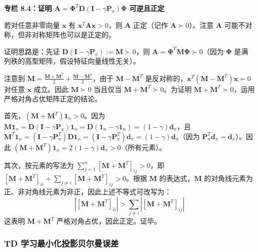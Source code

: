 \documentclass[UTF8]{article}
\begin{document}
\begin{proofbox}
\textbf{专栏 8.4：证明 $\boldsymbol{A} = \boldsymbol{\Phi}^T\boldsymbol{D}(\boldsymbol{I} - \gamma\boldsymbol{P}_\pi)\boldsymbol{\Phi}$ 可逆且正定}

若对任意非零向量 $\boldsymbol{x}$ 有 $\boldsymbol{x}^T\boldsymbol{A}\boldsymbol{x} > 0$，则 $\boldsymbol{A}$ 正定（记作 $\boldsymbol{A} \succ 0$）。注意 $\boldsymbol{A}$ 可能不对称，但非对称矩阵也可以是正定的。

证明思路是：先证 $\boldsymbol{D}(\boldsymbol{I} - \gamma\boldsymbol{P}_\pi) := \boldsymbol{M} \succ 0$，则 $\boldsymbol{A} = \boldsymbol{\Phi}^T\boldsymbol{M}\boldsymbol{\Phi} \succ 0$（因为 $\boldsymbol{\Phi}$ 是满列秩的高型矩阵，假设特征向量线性无关）。

注意到 $\boldsymbol{M} = \frac{\boldsymbol{M} + \boldsymbol{M}^T}{2} + \frac{\boldsymbol{M} - \boldsymbol{M}^T}{2}$，由于 $\boldsymbol{M} - \boldsymbol{M}^T$ 是反对称的，$\boldsymbol{x}^T(\boldsymbol{M} - \boldsymbol{M}^T)\boldsymbol{x} = 0$ 对任意 $\boldsymbol{x}$ 成立。因此 $\boldsymbol{M} \succ 0$ 当且仅当 $\boldsymbol{M} + \boldsymbol{M}^T \succ 0$。为证明 $\boldsymbol{M} + \boldsymbol{M}^T \succ 0$，运用严格对角占优矩阵正定的结论。

首先，$(\boldsymbol{M} + \boldsymbol{M}^T)\boldsymbol{1}_n > 0$。因为 $\boldsymbol{M}\boldsymbol{1}_n = \boldsymbol{D}(\boldsymbol{I} - \gamma\boldsymbol{P}_\pi)\boldsymbol{1}_n = \boldsymbol{D}(\boldsymbol{1}_n - \gamma\boldsymbol{1}_n) = (1-\gamma)\boldsymbol{d}_\pi$，且 $\boldsymbol{M}^T\boldsymbol{1}_n = (\boldsymbol{I} - \gamma\boldsymbol{P}_\pi^T)\boldsymbol{D}\boldsymbol{1}_n = (\boldsymbol{I} - \gamma\boldsymbol{P}_\pi^T)\boldsymbol{d}_\pi = (1-\gamma)\boldsymbol{d}_\pi$（因为 $\boldsymbol{P}_\pi^T\boldsymbol{d}_\pi = \boldsymbol{d}_\pi$）。因此 $(\boldsymbol{M} + \boldsymbol{M}^T)\boldsymbol{1}_n = 2(1-\gamma)\boldsymbol{d}_\pi > 0$（所有元素）。

其次，按元素的写法为 $\sum_{j=1}^n [\boldsymbol{M} + \boldsymbol{M}^T]_{ij} > 0$，即 $[\boldsymbol{M} + \boldsymbol{M}^T]_{ii} + \sum_{j \neq i} [\boldsymbol{M} + \boldsymbol{M}^T]_{ij} > 0$。根据 $\boldsymbol{M}$ 的表达式，$\boldsymbol{M}$ 的对角线元素为正、非对角线元素为非正，因此上述不等式可改写为：
\[
|[\boldsymbol{M} + \boldsymbol{M}^T]_{ii}| > \sum_{j \neq i} |[\boldsymbol{M} + \boldsymbol{M}^T]_{ij}|
\]
这表明 $\boldsymbol{M} + \boldsymbol{M}^T$ 严格对角占优，因此正定。证毕。
\end{proofbox}

\subsubsection*{TD 学习最小化投影贝尔曼误差}
\end{document}
